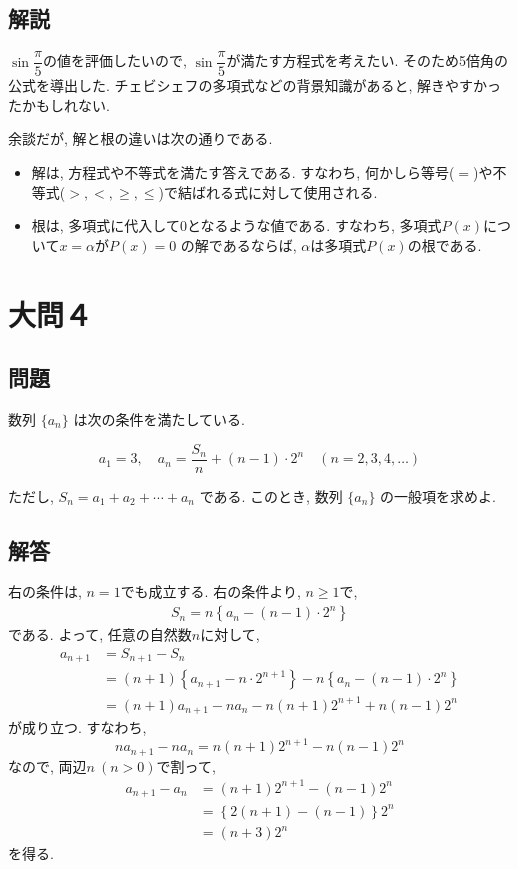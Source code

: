\documentclass[dvipdfmx,a4paper]{jsarticle}
\newcommand{\2}{I\hspace{-1pt}I}
\newcommand{\3}{I\hspace{-1pt}I\hspace{-1pt}I}
\begin{document}
    \subsection{解説}
    $\sin \dfrac{\pi}{5}$の値を評価したいので, $\sin \dfrac{\pi}{5}$が満たす方程式を考えたい. 
    そのため5倍角の公式を導出した. チェビシェフの多項式などの背景知識があると, 解きやすかったかもしれない. 

    余談だが, 解と根の違いは次の通りである. 
    \begin{itemize}
        \item 解は, 方程式や不等式を満たす答えである. すなわち, 何かしら等号($=$)や不等式($>,<,\geq, \leq$)で結ばれる式に対して使用される. 
        \item 根は, 多項式に代入して0となるような値である. すなわち, 多項式$P(x)$について$x=\alpha$が$P(x)=0$
        の解であるならば, $\alpha$は多項式$P(x)$の根である. 

    \end{itemize}

    \section{大問４}
    \subsection{問題}
    数列 $\{a_n\}$ は次の条件を満たしている. 

    \[
    a_1 = 3, \quad a_n = \frac{S_n}{n} + (n-1) \cdot 2^n \quad (n = 2, 3, 4, \ldots)
    \]

    ただし, $S_n = a_1 + a_2 + \cdots + a_n$ である. このとき, 数列 $\{a_n\}$ の一般項を求めよ. 
    \subsection{解答}
    右の条件は, $n=1$でも成立する. 右の条件より, $n\geq 1$で, 
    \begin{align*}
        S_n = n\left\{a_n -(n-1)\cdot 2^n\right\}
    \end{align*}
    である. よって, 任意の自然数$n$に対して, 
    \begin{align*}
        a_{n+1} &= S_{n+1} - S_n \\
                &= (n+1)\left\{a_{n+1} -n\cdot 2^{n+1}\right\} - n\left\{a_n -(n-1)\cdot 2^n\right\} \\
                &= (n+1)a_{n+1} - na_n -n(n+1)2^{n+1} + n(n-1)2^n
    \end{align*}
    が成り立つ. すなわち, 
    \[
        na_{n+1} - na_n = n(n+1)2^{n+1} - n(n-1)2^n
    \]
    なので, 両辺$n\ (n>0)$で割って, 
    \begin{align*}
        a_{n+1} - a_n &= (n+1)2^{n+1} - (n-1)2^n \\
        &= \left\{2(n+1)-(n-1)\right\}2^n \\
        &= (n+3)2^n
    \end{align*}
    を得る. 
\end{document}
